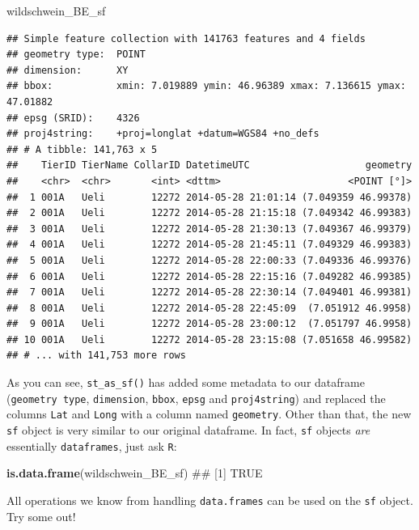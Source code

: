 \documentclass[]{book}
\newenvironment{Shaded}{\begin{snugshade}}{\end{snugshade}}
\newcommand{\KeywordTok}[1]{\textcolor[rgb]{0.13,0.29,0.53}{\textbf{{#1}}}}
\newcommand{\NormalTok}[1]{{#1}}
\theoremstyle{definition}
\theoremstyle{definition}
\theoremstyle{definition}
\theoremstyle{remark}
\begin{document}
\begin{Shaded}
\begin{Highlighting}[]
\NormalTok{wildschwein_BE_sf}
\end{Highlighting}
\end{Shaded}

\begin{verbatim}
## Simple feature collection with 141763 features and 4 fields
## geometry type:  POINT
## dimension:      XY
## bbox:           xmin: 7.019889 ymin: 46.96389 xmax: 7.136615 ymax: 47.01882
## epsg (SRID):    4326
## proj4string:    +proj=longlat +datum=WGS84 +no_defs
## # A tibble: 141,763 x 5
##    TierID TierName CollarID DatetimeUTC                    geometry
##    <chr>  <chr>       <int> <dttm>                      <POINT [°]>
##  1 001A   Ueli        12272 2014-05-28 21:01:14 (7.049359 46.99378)
##  2 001A   Ueli        12272 2014-05-28 21:15:18 (7.049342 46.99383)
##  3 001A   Ueli        12272 2014-05-28 21:30:13 (7.049367 46.99379)
##  4 001A   Ueli        12272 2014-05-28 21:45:11 (7.049329 46.99383)
##  5 001A   Ueli        12272 2014-05-28 22:00:33 (7.049336 46.99376)
##  6 001A   Ueli        12272 2014-05-28 22:15:16 (7.049282 46.99385)
##  7 001A   Ueli        12272 2014-05-28 22:30:14 (7.049401 46.99381)
##  8 001A   Ueli        12272 2014-05-28 22:45:09  (7.051912 46.9958)
##  9 001A   Ueli        12272 2014-05-28 23:00:12  (7.051797 46.9958)
## 10 001A   Ueli        12272 2014-05-28 23:15:08 (7.051658 46.99582)
## # ... with 141,753 more rows
\end{verbatim}

As you can see, \texttt{st\_as\_sf()} has added some metadata to our
dataframe (\texttt{geometry\ type}, \texttt{dimension}, \texttt{bbox},
\texttt{epsg} and \texttt{proj4string}) and replaced the columns
\texttt{Lat} and \texttt{Long} with a column named \texttt{geometry}.
Other than that, the new \texttt{sf} object is very similar to our
original dataframe. In fact, \texttt{sf} objects \emph{are} essentially
\texttt{dataframes}, just ask \texttt{R}:

\begin{Shaded}
\begin{Highlighting}[]
\KeywordTok{is.data.frame}\NormalTok{(wildschwein_BE_sf)}
\NormalTok{## [1] TRUE}
\end{Highlighting}
\end{Shaded}

All operations we know from handling \texttt{data.frames} can be used on
the \texttt{sf} object. Try some out!
\end{document}
